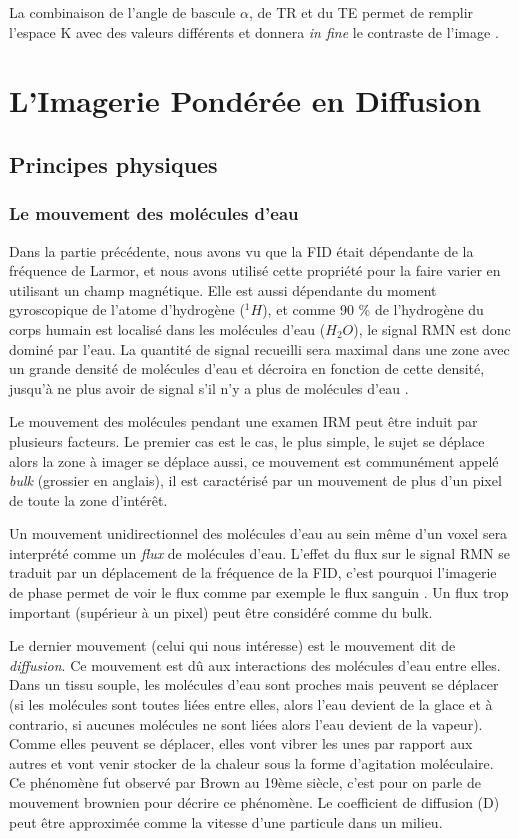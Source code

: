 La combinaison de l’angle de bascule $\alpha$, de TR et du TE permet de remplir l’espace K avec des valeurs différents et donnera \textit{in fine} le contraste de l’image \cite{Markl2012}.

\section{L’Imagerie Pondérée en Diffusion}
\subsection{Principes physiques}
\subsubsection{Le mouvement des molécules d’eau}
Dans la partie précédente, nous avons vu que la FID était dépendante de la fréquence de Larmor, et nous avons utilisé cette propriété pour la faire varier en utilisant un champ magnétique. Elle est aussi dépendante du moment gyroscopique de l’atome d’hydrogène ($^1H$), et comme 90 \% de l’hydrogène du corps humain est localisé dans les molécules d’eau ($H_2O$), le signal RMN est donc dominé par l’eau. La quantité de signal recueilli sera maximal dans une zone avec un grande densité de molécules d’eau et décroira en fonction de cette densité, jusqu’à ne plus avoir de signal s’il n’y a plus de molécules d’eau \cite{Mezer2016}.

Le mouvement des molécules pendant une examen IRM peut être induit par plusieurs facteurs. Le premier cas est le cas, le plus simple, le sujet se déplace alors la zone à imager se déplace aussi, ce mouvement est communément appelé \textit{bulk} (grossier en anglais), il est caractérisé par un mouvement de plus d’un pixel de toute la zone d’intérêt.

Un mouvement unidirectionnel des molécules d’eau au sein même d’un voxel sera interprété comme un \textit{flux} de molécules d’eau. L’effet du flux sur le signal RMN se traduit par un déplacement de la fréquence de la FID, c’est pourquoi l’imagerie de phase permet de voir le flux comme par exemple le flux sanguin \cite{Wymer2020}. Un flux trop important (supérieur à un pixel) peut être considéré comme du bulk.

Le dernier mouvement (celui qui nous intéresse) est le mouvement dit de \textit{diffusion}. Ce mouvement est dû aux interactions des molécules d’eau entre elles. Dans un tissu souple, les molécules d’eau sont proches mais peuvent se déplacer (si les molécules sont toutes liées entre elles, alors l’eau devient de la glace et à contrario, si aucunes molécules ne sont liées alors l’eau devient de la vapeur). Comme elles peuvent se déplacer, elles vont vibrer les unes par rapport aux autres et vont venir stocker de la chaleur sous la forme d’agitation moléculaire. Ce phénomène fut observé par Brown au 19ème siècle, c’est pour on parle de mouvement brownien pour décrire ce phénomène. Le coefficient de diffusion (D) peut être approximée comme la vitesse d’une particule dans un milieu.

